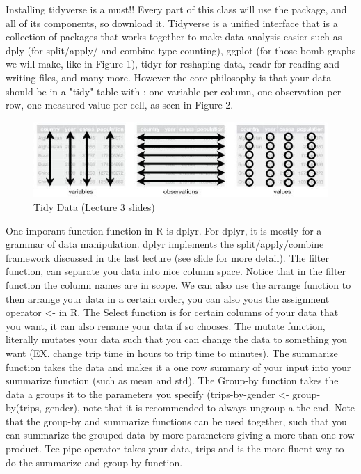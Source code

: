 Installing tidyverse is a must!! Every part of this class will use the package, and all of its components, so download it. Tidyverse is a unified interface that is a collection of packages that works together to make data analysis easier such as dply (for split/apply/ and combine type counting), ggplot (for those bomb graphs we will make, like in Figure 1), tidyr for reshaping data, readr for reading and writing files, and many more. However the core philosophy is that your data should be in a "tidy" table with : one variable per column, one observation per row, one measured value per cell, as seen in Figure 2. \begin{figure}[h!]
  \caption{ Tidy Data (Lecture 3 slides)}
  \includegraphics[width=\textwidth]{figures/MSDimage2}
\end{figure} One imporant function function in R is dplyr. For dplyr, it is mostly for a grammar of data manipulation. dplyr implements the split/apply/combine framework discussed in the last lecture (see slide for more detail). The filter function, can separate you data into nice column space. Notice that in the filter function the column names are in scope. We can also use the arrange function to then arrange your data in a certain order, you can also yous the assignment operator <- in R. The Select function is for certain columns of your data that you want, it can also rename your data if so chooses. The mutate function, literally mutates your data such that you can change the data to something you want (EX. change trip time in hours to trip time to minutes). The summarize function takes the data and makes it a one row summary of your input into your summarize function (such as mean and std). The Group-by function takes the data a groups it to the parameters you specify (trips-by-gender <- group-by(trips, gender), note that it is recommended to always ungroup a the end. Note that the group-by and summarize functions can be used together, such that you can summarize the grouped data by more parameters giving a more than one row product. Tee pipe operator takes your data, trips and is the more fluent way to do the summarize and group-by function. 

